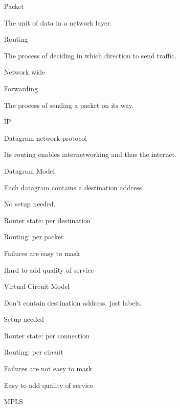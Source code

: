\documentclass[main.tex]{subfiles}
\begin{document}
\small


\begin{card}{Packet}
\item The unit of data in a network layer.
\end{card}

\begin{card}{Routing}
\item The process of deciding in which direction to send traffic.
\item Network wide
\end{card}

\begin{card}{Forwarding}
\item The process of sending a packet on its way.
\end{card}

\begin{card}{IP}
\item Datagram network protocol
\item Its routing enables internetworking and thus the internet.
\end{card}

\begin{card}{Datagram Model}
\item Each datagram contains a destination address.
\item No setup needed.
\item Router state: per destination
\item Routing: per packet
\item Failures are easy to mask
\item Hard to add quality of service
\end{card}

\begin{card}{Virtual Circuit Model}
\item Don't contain destination address, just labels.
\item Setup needed
\item Router state: per connection
\item Routing: per circuit
\item Failures are not easy to mask
\item Easy to add quality of service
\end{card}

\begin{card}{MPLS}
\TODO
\end{card}
\end{document}
